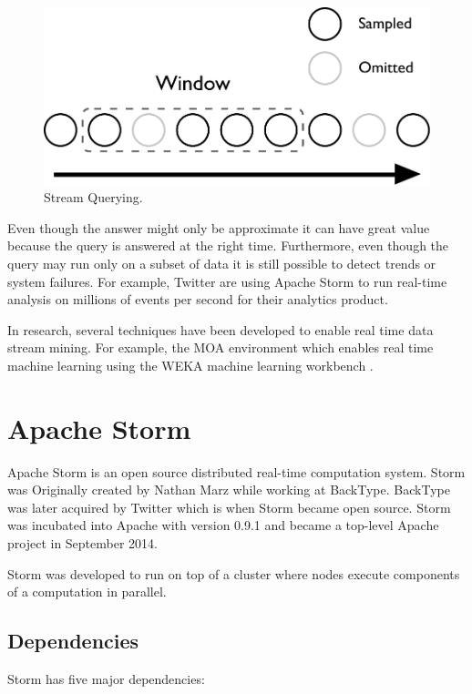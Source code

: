 \begin{figure}[!htb]
	\centering
	\includegraphics[scale=0.5]{pdf/stream.pdf}
	\caption{Stream Querying.}
	\label{fig:stream}
\end{figure}

Even though the answer might only be approximate it can have great value because the query is answered at the right time. Furthermore, even though the query may run only on a subset of data it is still possible to detect trends or system failures. For example, Twitter are using Apache Storm to run real-time analysis on millions of events per second for their analytics product. \cite{Solovey}

In research, several techniques have been developed to enable real time data stream mining. For example, the MOA environment \cite{Bifet:2010:MMO:1756006.1859903} which enables real time machine learning using the WEKA machine learning workbench \cite{Holmes1994}.

\section{Apache Storm}

Apache Storm is an open source distributed real-time computation system. Storm was Originally created by Nathan Marz while working at BackType. \cite{NathanAbout} BackType was later acquired by Twitter which is when Storm became open source. Storm was incubated into Apache with version 0.9.1 and became a top-level Apache project in September 2014.

Storm was developed to run on top of a cluster where nodes execute components of a computation in parallel.

\subsection{Dependencies}

Storm has five major dependencies:

